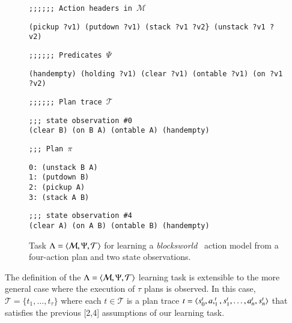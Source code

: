 \begin{figure}[hbt!]
{\footnotesize\tt ;;;;;; Action headers in $\mathcal{M}$}  
\begin{footnotesize}  
\begin{verbatim}
(pickup ?v1) (putdown ?v1) (stack ?v1 ?v2} (unstack ?v1 ?v2)
\end{verbatim}
\end{footnotesize}
\vspace{0.2cm}
{\footnotesize\tt ;;;;;; Predicates $\Psi$}
\begin{footnotesize}
\begin{verbatim}
(handempty) (holding ?v1) (clear ?v1) (ontable ?v1) (on ?v1 ?v2)
\end{verbatim}
\end{footnotesize}
\vspace{0.2cm}
{\footnotesize\tt ;;;;;; Plan trace $\mathcal{T}$}
\begin{footnotesize}
\begin{verbatim}
;;; state observation #0
(clear B) (on B A) (ontable A) (handempty)
\end{verbatim}
\end{footnotesize}

\begin{footnotesize}
{\footnotesize\tt ;;; Plan $\pi$}
\begin{verbatim}
0: (unstack B A)
1: (putdown B)
2: (pickup A)
3: (stack A B)
\end{verbatim}
\end{footnotesize}

\begin{footnotesize}
\begin{verbatim}
;;; state observation #4
(clear A) (on A B) (ontable B) (handempty)
\end{verbatim}
\end{footnotesize}

 \caption{\small Task $\Lambda={\langle \mathcal{M},\Psi,\mathcal{T} \rangle}$ for learning a {\em blocksworld} \strips\ action model from a four-action plan and two state observations.}
\label{fig:example-plans}
\end{figure}

The definition of the $\Lambda={\langle \mathcal{M},\Psi,\mathcal{T} \rangle}$ learning task is extensible to the more general case where the execution of $\tau$ plans is observed. In this case, $\mathcal{T}=\{t_1,\ldots,t_{\tau}\}$ where each $t\in \mathcal{T}$ is a plan trace $t={\langle s_0^t,a,_1^t,s_1^t,\ldots,a_n^t,s_{n}^t \rangle}$ that satisfies the previous [2,4] assumptions of our learning task.


